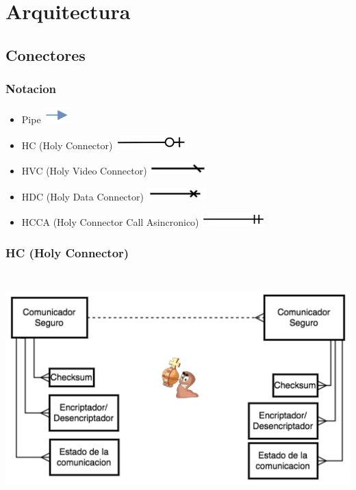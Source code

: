 
\section{Arquitectura}
\subsection{Conectores}
\subsubsection{Notacion}

\begin{itemize}
\item Pipe \includegraphics[height=0.6cm]{diagramas/NPIPE} 
\item HC (Holy Connector) \includegraphics[height=0.5cm]{diagramas/NHC} 
\item HVC (Holy Video Connector) \includegraphics[height=0.5cm]{diagramas/NHVC} 
\item HDC (Holy Data Connector) \includegraphics[height=0.5cm]{diagramas/NHDC} 
\item HCCA (Holy Connector Call Asincronico) \includegraphics[height=0.5cm]{diagramas/NHCCA} 

\end{itemize}

\subsubsection{HC (Holy Connector)}

\includegraphics[height=9cm]{diagramas/HC} 

